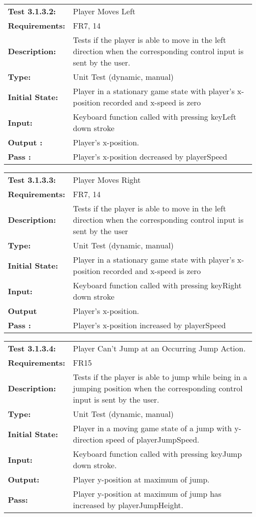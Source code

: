 \documentclass[12pt, titlepage]{article}
\begin{document}
\begin{tabular}{|l|p{10cm}|}
    \hline
    \bf{Test} 3.1.3.2: & Player Moves Left \\
    \bf{Requirements}: & FR7, 14\\
    \bf{Description}: & Tests if the player is able to move in the left direction when the corresponding control input is sent by the user.\\
    \bf{Type}: & Unit Test (dynamic, manual) \\
    \bf{Initial State}: & Player in a stationary game state with player's x-position recorded and x-speed is zero\\
    \bf{Input}: & Keyboard function called with pressing keyLeft down stroke\\
    \bf{Output} : & Player's x-position.\\
    \bf{Pass} : & Player's x-position decreased by playerSpeed\\
    \hline
\end{tabular}

\begin{tabular}{|l|p{10cm}|}
    \hline
    \bf{Test} 3.1.3.3: & Player Moves Right \\
    \bf{Requirements}: & FR7, 14\\
    \bf{Description}: & Tests if the player is able to move in the left direction when the corresponding control input is sent by the user \\
    \bf{Type}: & Unit Test (dynamic, manual) \\
    \bf{Initial State}: & Player in a stationary game state with player's x-position recorded and x-speed is zero  \\
    \bf{Input}: & Keyboard function called with pressing keyRight down stroke \\
    \bf{Output} & Player's x-position. \\
    \bf{Pass} : & Player's x-position increased by playerSpeed\\
    \hline
\end{tabular}

\begin{tabular}{|l|p{10cm}|}
    \hline
    \bf{Test} 3.1.3.4: & Player Can't Jump at an Occurring Jump Action.\\
    \bf{Requirements}: & FR15\\
    \bf{Description}: &  Tests if the player is able to jump while being in a jumping position when the corresponding control input is sent by the user.\\
    \bf{Type}: & Unit Test (dynamic, manual) \\
    \bf{Initial State}: & Player in a moving game state of a jump with y-direction speed of playerJumpSpeed. \\
    \bf{Input}: & Keyboard function called with pressing keyJump down stroke. \\
    \bf{Output}: & Player y-position at maximum of jump.\\
    \bf{Pass}: & Player y-position at maximum of jump has increased by playerJumpHeight.\\  
    \hline
\end{tabular}
\end{document}
